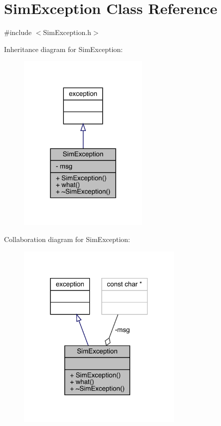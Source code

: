 \hypertarget{class_sim_exception}{}\section{Sim\+Exception Class Reference}
\label{class_sim_exception}


{\ttfamily \#include $<$Sim\+Exception.\+h$>$}



Inheritance diagram for Sim\+Exception\+:\nopagebreak
\begin{figure}[H]
\begin{center}
\leavevmode
\includegraphics[width=178pt]{class_sim_exception__inherit__graph}
\end{center}
\end{figure}


Collaboration diagram for Sim\+Exception\+:\nopagebreak
\begin{figure}[H]
\begin{center}
\leavevmode
\includegraphics[width=226pt]{class_sim_exception__coll__graph}
\end{center}
\end{figure}
